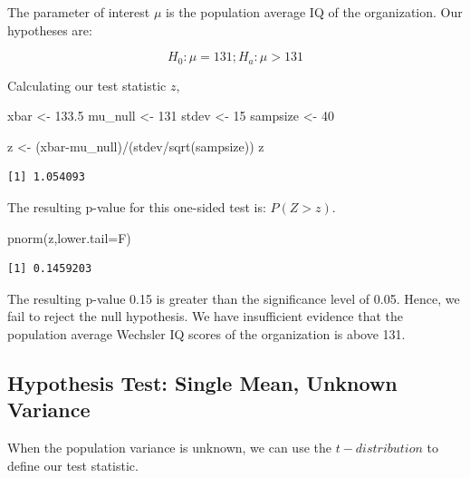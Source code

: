 \documentclass[
  letterpaper,
  DIV=11,
  numbers=noendperiod]{scrartcl}
\newenvironment{Shaded}{\begin{snugshade}}{\end{snugshade}}
\newcommand{\AttributeTok}[1]{\textcolor[rgb]{0.40,0.45,0.13}{#1}}
\newcommand{\DecValTok}[1]{\textcolor[rgb]{0.68,0.00,0.00}{#1}}
\newcommand{\FloatTok}[1]{\textcolor[rgb]{0.68,0.00,0.00}{#1}}
\newcommand{\FunctionTok}[1]{\textcolor[rgb]{0.28,0.35,0.67}{#1}}
\newcommand{\NormalTok}[1]{\textcolor[rgb]{0.00,0.23,0.31}{#1}}
\newcommand{\OtherTok}[1]{\textcolor[rgb]{0.00,0.23,0.31}{#1}}
\newcommand{\SpecialCharTok}[1]{\textcolor[rgb]{0.37,0.37,0.37}{#1}}
\begin{document}
The parameter of interest \(\mu\) is the population average IQ of the
organization. Our hypotheses are:

\[
H_0: \mu = 131; H_a: \mu > 131
\]

Calculating our test statistic \(z\),

\begin{Shaded}
\begin{Highlighting}[]
\NormalTok{xbar }\OtherTok{\textless{}{-}} \FloatTok{133.5}
\NormalTok{mu\_null }\OtherTok{\textless{}{-}} \DecValTok{131}
\NormalTok{stdev }\OtherTok{\textless{}{-}} \DecValTok{15}
\NormalTok{sampsize }\OtherTok{\textless{}{-}} \DecValTok{40}

\NormalTok{z }\OtherTok{\textless{}{-}}\NormalTok{ (xbar}\SpecialCharTok{{-}}\NormalTok{mu\_null)}\SpecialCharTok{/}\NormalTok{(stdev}\SpecialCharTok{/}\FunctionTok{sqrt}\NormalTok{(sampsize))}
\NormalTok{z}
\end{Highlighting}
\end{Shaded}

\begin{verbatim}
[1] 1.054093
\end{verbatim}

The resulting p-value for this one-sided test is: \(P(Z > z)\).

\begin{Shaded}
\begin{Highlighting}[]
\FunctionTok{pnorm}\NormalTok{(z,}\AttributeTok{lower.tail=}\NormalTok{F)}
\end{Highlighting}
\end{Shaded}

\begin{verbatim}
[1] 0.1459203
\end{verbatim}

The resulting p-value 0.15 is greater than the significance level of
0.05. Hence, we fail to reject the null hypothesis. We have insufficient
evidence that the population average Wechsler IQ scores of the
organization is above 131.

\subsection{Hypothesis Test: Single Mean, Unknown
Variance}\label{hypothesis-test-single-mean-unknown-variance}

When the population variance is unknown, we can use the
\(t-distribution\) to define our test statistic.
\end{document}
